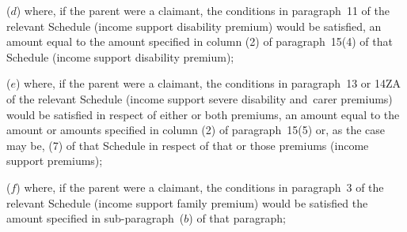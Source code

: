 \documentclass[12pt,a4paper]{article}
\begin{document}
\begin{enumerate}

%
%

($d$) where, if the parent were a claimant, the conditions in paragraph~11 of the relevant Schedule (income support disability premium) would be satisfied, an amount equal to the amount specified in column (2) of paragraph~15(4) of that Schedule (income support disability premium);

($e$) where, if the parent were a claimant, the conditions in paragraph~13 or 14ZA of the relevant Schedule (income support severe disability and~carer premiums) would be satisfied in respect of either or both premiums, an amount equal to the amount or amounts specified in column (2) of paragraph~15(5) or, as the case may be, (7) of that Schedule in respect of that or those premiums (income support premiums);

($f$) where, if the parent were a claimant, the conditions in paragraph~3 of the relevant Schedule (income support family premium) would be satisfied 
the amount specified in 
sub-paragraph~($b$) of  %
that paragraph;


\end{enumerate}
\end{document}
